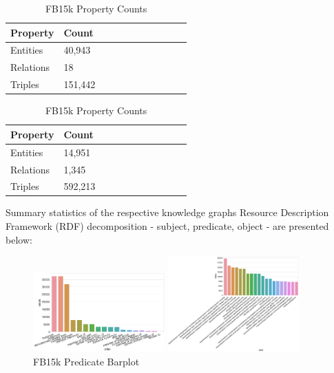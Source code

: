\begin{table}[H]
	\parbox{.5\linewidth}{
		\caption{WN18 Property Counts}
		\centering
		\begin{tabular}{lllllllllll}
  			\textbf{Property} & \textbf{Count}  \\
  			\hline
  			Entities & 40,943  \\
  			Relations & 18  \\
  			Triples & 151,442 \\
		\end{tabular}
		}
	\hfill
	\parbox{.5\linewidth}{
		\caption{FB15k Property Counts}
		\centering
		\begin{tabular}{lllllllllll}
  			\textbf{Property} & \textbf{Count}  \\
  			\hline
  			Entities & 14,951   \\
  			Relations & 1,345  \\
  			Triples & 592,213  \\
		\end{tabular}
		}
\end{table}

Summary statistics of the respective knowledge graphs Resource Description Framework (RDF) decomposition - subject, predicate, object - are presented below:


\begin{figure}[H]
	\parbox{.5\linewidth}{
   		\caption{WN18 Predicate Barplot}
   		\centering
    		\includegraphics[width=0.45\textwidth, height=0.2\textheight]{WN18_Predicate_Counts}
		}
	\hfill
	\parbox{.5\linewidth}{
		\caption{FB15k Predicate Barplot}
   		\centering
		\includegraphics[width=0.45\textwidth, height=0.2\textheight]{FB15k_Predicate_Counts}
		}
\end{figure}

